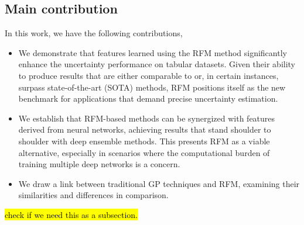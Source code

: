 




\subsection{Main contribution}
In this work, we have the following contributions,

\begin{itemize}
    \item We demonstrate that features learned using the RFM method significantly enhance the uncertainty performance on tabular datasets. Given their ability to produce results that are either comparable to or, in certain instances, surpass state-of-the-art (SOTA) methods, RFM positions itself as the new benchmark for applications that demand precise uncertainty estimation.
    \item We establish that RFM-based methods can be synergized with features derived from neural networks, achieving results that stand shoulder to shoulder with deep ensemble methods. This presents RFM as a viable alternative, especially in scenarios where the computational burden of training multiple deep networks is a concern.
    \item We draw a link between traditional GP techniques and RFM, examining their similarities and differences in comparison.
\end{itemize}
\hl{check if we need this as a subsection.}

